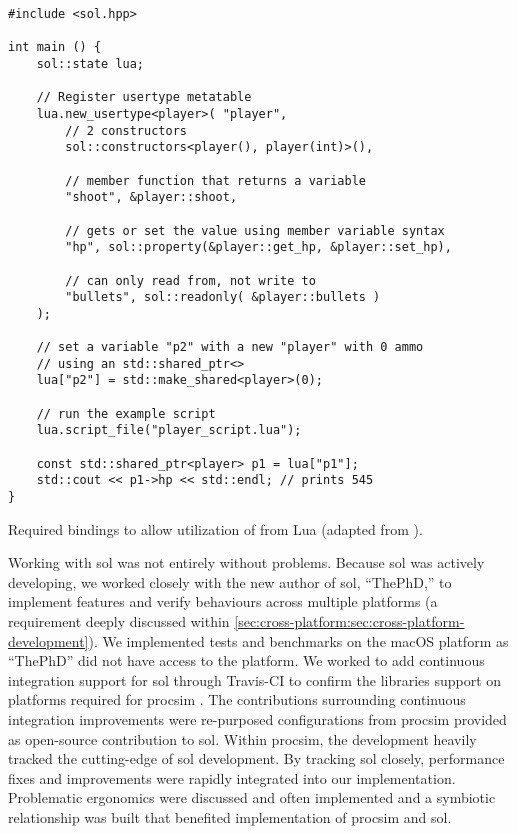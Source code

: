 \begin{listing}[hp]
\begin{verbatim}
#include <sol.hpp>

int main () {
    sol::state lua;
    
    // Register usertype metatable
    lua.new_usertype<player>( "player",
        // 2 constructors
        sol::constructors<player(), player(int)>(),
        
        // member function that returns a variable
        "shoot", &player::shoot,
        
        // gets or set the value using member variable syntax
        "hp", sol::property(&player::get_hp, &player::set_hp),
        
        // can only read from, not write to
        "bullets", sol::readonly( &player::bullets )
    );
    
    // set a variable "p2" with a new "player" with 0 ammo
    // using an std::shared_ptr<>
    lua["p2"] = std::make_shared<player>(0);
    
    // run the example script
    lua.script_file("player_script.lua");
    
    const std::shared_ptr<player> p1 = lua["p1"];
    std::cout << p1->hp << std::endl; // prints 545
}
\end{verbatim}
\caption{Required bindings to allow utilization of  from Lua (adapted from \cite{GitHub:ThePhD:sol2:cxx-in-lua}).}
\label{lst:lua:sol2-example:bindings}
\end{listing}

Working with sol was not entirely without problems. Because sol was actively developing, we worked closely with the new author of sol, ``ThePhD,'' to implement features and verify behaviours across multiple platforms (a requirement deeply discussed within \cref{sec:cross-platform:sec:cross-platform-development}). We implemented tests and benchmarks on the macOS platform as ``ThePhD'' did not have access to the platform. We worked to add continuous integration support for sol through Travis-CI \cite{TravisCI} to confirm the libraries support on platforms required for procsim \cite{GitHub:ThePhD:sol2:pr:17, GitHub:ThePhD:sol2:pr:18}. The contributions surrounding continuous integration improvements were re-purposed configurations from procsim provided as open-source contribution to sol. Within procsim, the development heavily tracked the cutting-edge of sol development. By tracking sol closely, performance fixes and improvements were rapidly integrated into our implementation. Problematic ergonomics were discussed and often implemented and a symbiotic relationship was built that benefited implementation of procsim and sol. 


